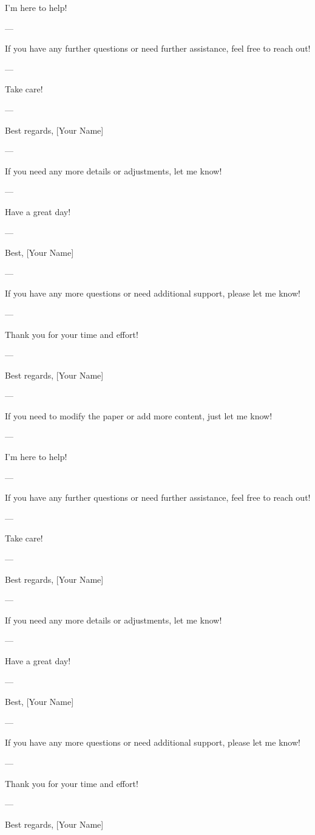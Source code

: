 I'm here to help! 

--- 

If you have any further questions or need further assistance, feel free to reach out! 

--- 

Take care! 

--- 

Best regards,  
[Your Name] 

--- 

If you need any more details or adjustments, let me know! 

--- 

Have a great day! 

--- 

Best,  
[Your Name] 

--- 

If you have any more questions or need additional support, please let me know! 

--- 

Thank you for your time and effort! 

--- 

Best regards,  
[Your Name] 

--- 

If you need to modify the paper or add more content, just let me know! 

--- 

I'm here to help! 

--- 

If you have any further questions or need further assistance, feel free to reach out! 

--- 

Take care! 

--- 

Best regards,  
[Your Name] 

--- 

If you need any more details or adjustments, let me know! 

--- 

Have a great day! 

--- 

Best,  
[Your Name] 

--- 

If you have any more questions or need additional support, please let me know! 

--- 

Thank you for your time and effort! 

--- 

Best regards,  
[Your Name] 

